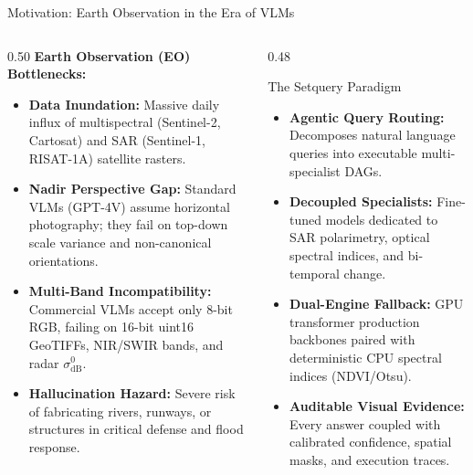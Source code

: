 \documentclass[aspectratio=169, 10pt]{beamer}
\begin{document}
\begin{frame}{Motivation: Earth Observation in the Era of VLMs}
  \vspace{-0.2em}
  \begin{columns}[T]
    \begin{column}{0.50\textwidth}
      \textbf{\color{IEEEDarkBlue}Earth Observation (EO) Bottlenecks:}
      \begin{itemize}\setlength{\itemsep}{2.5pt}\small
        \item \textbf{Data Inundation:} Massive daily influx of multispectral (Sentinel-2, Cartosat) and SAR (Sentinel-1, RISAT-1A) satellite rasters.
        \item \textbf{Nadir Perspective Gap:} Standard VLMs (GPT-4V) assume horizontal photography; they fail on top-down scale variance and non-canonical orientations.
        \item \textbf{Multi-Band Incompatibility:} Commercial VLMs accept only 8-bit RGB, failing on 16-bit uint16 GeoTIFFs, NIR/SWIR bands, and radar $\sigma^0_{\text{dB}}$.
        \item \textbf{Hallucination Hazard:} Severe risk of fabricating rivers, runways, or structures in critical defense and flood response.
      \end{itemize}
    \end{column}

    \begin{column}{0.48\textwidth}
      \begin{block}{\small The Setquery Paradigm}
        \begin{itemize}\setlength{\itemsep}{2.5pt}\small
          \item \textbf{Agentic Query Routing:} Decomposes natural language queries into executable multi-specialist DAGs.
          \item \textbf{Decoupled Specialists:} Fine-tuned models dedicated to SAR polarimetry, optical spectral indices, and bi-temporal change.
          \item \textbf{Dual-Engine Fallback:} GPU transformer production backbones paired with deterministic CPU spectral indices (NDVI/Otsu).
          \item \textbf{Auditable Visual Evidence:} Every answer coupled with calibrated confidence, spatial masks, and execution traces.
        \end{itemize}
      \end{block}
    \end{column}
  \end{columns}
\end{frame}
\end{document}
